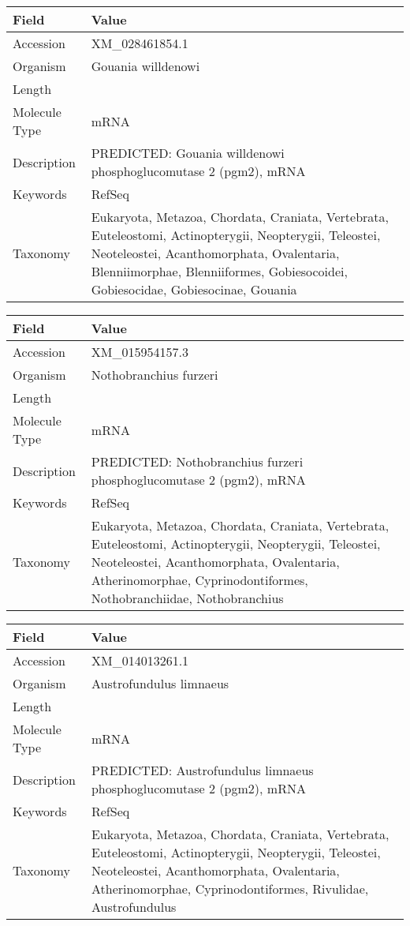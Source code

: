 \documentclass[10pt]{article}
\begin{document}
{\footnotesize
\begin{longtable}{>{\raggedright\arraybackslash}p{4.5cm} >{\raggedright\arraybackslash}p{11.5cm}}
\textbf{Field} & \textbf{Value} \\
\hline
Accession & XM\_028461854.1 \\
Organism & Gouania willdenowi \\
Length & 3992 \\
Molecule Type & mRNA \\
Description & PREDICTED: Gouania willdenowi phosphoglucomutase 2 (pgm2), mRNA \\
Keywords & RefSeq \\
Taxonomy & Eukaryota, Metazoa, Chordata, Craniata, Vertebrata, Euteleostomi, Actinopterygii, Neopterygii, Teleostei, Neoteleostei, Acanthomorphata, Ovalentaria, Blenniimorphae, Blenniiformes, Gobiesocoidei, Gobiesocidae, Gobiesocinae, Gouania \\
\end{longtable}
}

{\footnotesize
\begin{longtable}{>{\raggedright\arraybackslash}p{4.5cm} >{\raggedright\arraybackslash}p{11.5cm}}
\textbf{Field} & \textbf{Value} \\
\hline
Accession & XM\_015954157.3 \\
Organism & Nothobranchius furzeri \\
Length & 2455 \\
Molecule Type & mRNA \\
Description & PREDICTED: Nothobranchius furzeri phosphoglucomutase 2 (pgm2), mRNA \\
Keywords & RefSeq \\
Taxonomy & Eukaryota, Metazoa, Chordata, Craniata, Vertebrata, Euteleostomi, Actinopterygii, Neopterygii, Teleostei, Neoteleostei, Acanthomorphata, Ovalentaria, Atherinomorphae, Cyprinodontiformes, Nothobranchiidae, Nothobranchius \\
\end{longtable}
}

{\footnotesize
\begin{longtable}{>{\raggedright\arraybackslash}p{4.5cm} >{\raggedright\arraybackslash}p{11.5cm}}
\textbf{Field} & \textbf{Value} \\
\hline
Accession & XM\_014013261.1 \\
Organism & Austrofundulus limnaeus \\
Length & 3022 \\
Molecule Type & mRNA \\
Description & PREDICTED: Austrofundulus limnaeus phosphoglucomutase 2 (pgm2), mRNA \\
Keywords & RefSeq \\
Taxonomy & Eukaryota, Metazoa, Chordata, Craniata, Vertebrata, Euteleostomi, Actinopterygii, Neopterygii, Teleostei, Neoteleostei, Acanthomorphata, Ovalentaria, Atherinomorphae, Cyprinodontiformes, Rivulidae, Austrofundulus \\
\end{longtable}
}
\end{document}
